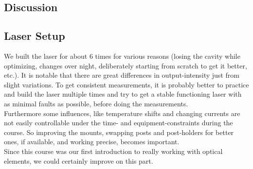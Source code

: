 \documentclass[12pt,a4paper]{article}
\begin{document}
\begin{multicols}{2}



\section{Discussion}
\subsection{Laser Setup}
We built the laser for about 6 times for various reasons (losing the cavity while optimizing, changes over night, deliberately starting from scratch to get it better, etc.). It is notable that there are great differences in output-intensity just from slight variations. To get consistent measurements, it is probably better to practice and build the laser multiple times and try to get a stable functioning laser with as minimal faults as possible, before doing the measurements.\\
Furthermore some influences, like temperature shifts and changing currents are not easily controllable under the time- and equipment-constraints during the course. So improving the mounts, swapping posts and post-holders for better ones, if available, and working precise, becomes important.\\
Since this course was our first introduction to really working with optical elements, we could certainly improve on this part.\\
\\

\end{multicols}
\end{document}
